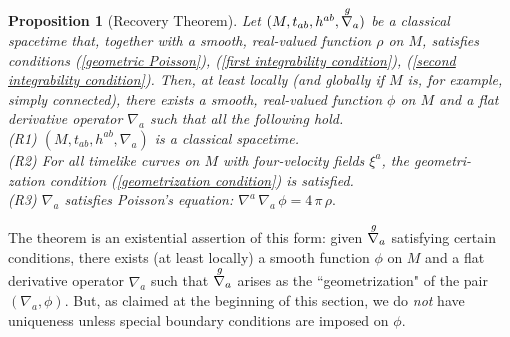 \documentclass [12] {article}
\theoremstyle{plain}
\newtheorem{proposition}{Proposition}[subsection]
\numberwithin{figure}{subsection}
\numberwithin{proposition}{subsection}
\begin{document}
\begin{proposition} [Recovery Theorem] \label{Recovery Theorem}  Let $(M, t_{ab}, h^{ab}, \stackrel{g \hspace{.4em}}{\nabla_a})$ be a classical spacetime that, together with a smooth, real-valued function $\rho$ on $M$, satisfies conditions  (\ref{geometric Poisson}), (\ref{first integrability condition}), (\ref{second integrability condition}).  Then, at least locally (and globally if $M$ is, for example, simply connected), there exists a smooth, real-valued function $\phi$ on $M$ and a flat derivative operator $\nabla_a$ such that all the following hold. \\
\indent (R1)  $(M, t_{ab}, h^{ab}, \nabla_a)$  is a classical spacetime. \\
\indent (R2)    For all timelike curves on $M$ with four-velocity fields $\xi^a$,  the geometri-  \\
\indent  \indent  \indent  zation condition (\ref{geometrization condition})  is satisfied.  \\
\indent (R3) $\nabla_a$ satisfies Poisson's equation:  $\nabla^a \, \nabla_a  \, \phi  =  4  \, \pi  \, \rho.$
 \end{proposition}
%
The theorem is an existential assertion of this form: given $\stackrel{g \hspace{.4em}}{\nabla_a}$ satisfying certain conditions, there exists (at least locally) a smooth function  $\phi$ on $M$ and a flat derivative operator $\nabla_a$ such that  $\stackrel{g \hspace{.4em}}{\nabla_a}$ arises as the ``geometrization" of the pair  $(\nabla_a, \phi)$. But, as claimed at the beginning of this section,
we do \emph{not} have uniqueness unless special boundary conditions are imposed on $\phi$.  
\end{document}

